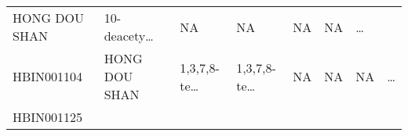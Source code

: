 \documentclass[
]{article}
\begin{document}
\begin{longtable}[]{@{}llllllll@{}}
\begin{minipage}[t]{0.11\columnwidth}
HONG DOU SHAN\strut
\end{minipage} & \begin{minipage}[t]{0.14\columnwidth}\raggedright
10-deacety\ldots{}\strut
\end{minipage} & \begin{minipage}[t]{0.14\columnwidth}\raggedright
NA\strut
\end{minipage} & \begin{minipage}[t]{0.08\columnwidth}\raggedright
NA\strut
\end{minipage} & \begin{minipage}[t]{0.09\columnwidth}\raggedright
NA\strut
\end{minipage} & \begin{minipage}[t]{0.11\columnwidth}\raggedright
NA\strut
\end{minipage} & \begin{minipage}[t]{0.03\columnwidth}\raggedright
\ldots{}\strut
\end{minipage}\tabularnewline
\begin{minipage}[t]{0.11\columnwidth}\raggedright
HBIN001104\strut
\end{minipage} & \begin{minipage}[t]{0.11\columnwidth}\raggedright
HONG DOU SHAN\strut
\end{minipage} & \begin{minipage}[t]{0.14\columnwidth}\raggedright
1,3,7,8-te\ldots{}\strut
\end{minipage} & \begin{minipage}[t]{0.14\columnwidth}\raggedright
1,3,7,8-te\ldots{}\strut
\end{minipage} & \begin{minipage}[t]{0.08\columnwidth}\raggedright
NA\strut
\end{minipage} & \begin{minipage}[t]{0.09\columnwidth}\raggedright
NA\strut
\end{minipage} & \begin{minipage}[t]{0.11\columnwidth}\raggedright
NA\strut
\end{minipage} & \begin{minipage}[t]{0.03\columnwidth}\raggedright
\ldots{}\strut
\end{minipage}\tabularnewline
\begin{minipage}[t]{0.11\columnwidth}\raggedright
HBIN001125\strut
\end{minipage} & \begin{minipage}[t]{0.11\columnwidth}\raggedright

\end{minipage}
\end{longtable}
\end{document}
